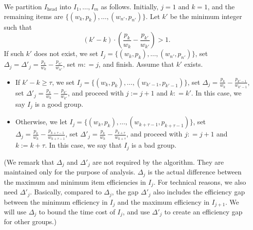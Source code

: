 \documentclass[a4paper,UKenglish,cleveref, autoref, thm-restate, pdfa]{lipics-v2021}
\renewcommand{\geq}{\geqslant}
\begin{document}
We partition $I_{\mathrm{head}}$ into $I_1, \ldots, I_m$ as follows. Initially, $j = 1$ and $k = 1$, and the remaining items are $\{(w_k, p_k), \ldots, (w_{n'}, p_{n'})\}$. Let $k'$ be the minimum integer such that
\[
    (k' - k) \cdot (\frac{p_k}{w_k} - \frac{p_{k'}}{w_{k'}}) > 1.
\]
If such $k'$ does not exist, we set $I_j = \{(w_k, p_k), \ldots, (w_{n'}, p_{n'})\}$, set $\Delta_j = \Delta'_j = \frac{p_k}{w_k} - \frac{p_{n'}}{w_{n'}}$, set $m: = j$, and finish. Assume that $k'$ exists. 
\begin{itemize}
    \item If $k' - k \geq \tau$, we set $I_j = \{(w_k, p_k), \ldots, (w_{k' - 1}, p_{k'-1})\}$, set $\Delta_j = \frac{p_k}{w_k} - \frac{p_{k'-1}}{w_{k'-1}}$, set $\Delta'_j = \frac{p_k}{w_k} - \frac{p_{k'}}{w_{k'}}$, and proceed with $j := j + 1$ and $k: = k'$. In this case, we say $I_j$ is a good group. 

    \item Otherwise, we let $I_j = \{(w_k, p_k), \ldots, (w_{k + \tau - 1}, p_{k + \tau - 1})\}$, set $\Delta_j = \frac{p_k}{w_k} - \frac{p_{k + \tau - 1}}{w_{k+\tau - 1}}$, set $\Delta'_j = \frac{p_k}{w_k} - \frac{p_{k + \tau}}{w_{k+\tau}}$, and proceed with $j: = j + 1$ and $k:= k + \tau$. In this case, we say that $I_j$ is a bad group. 
\end{itemize}
(We remark that $\Delta_j$ and $\Delta'_j$ are not required by the algorithm. They are maintained only for the purpose of analysis. $\Delta_j$ is the actual difference between the maximum and minimum item efficiencies in $I_j$. For technical reasons, we also need $\Delta'_j$. Basically, compared to $\Delta_j$, the gap $\Delta'_j$ also includes the efficiency gap between the minimum efficiency in $I_j$ and the maximum efficiency in $I_{j+1}$. We will use $\Delta_j$ to bound the time cost of $I_j$, and use $\Delta'_j$ to create an efficiency gap for other groups.)
\end{document}
